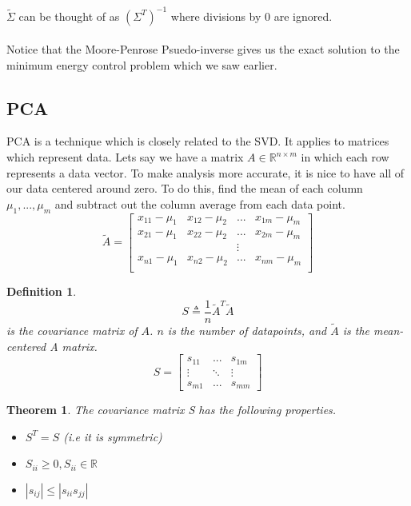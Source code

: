 \documentclass{article}
\newtheorem{theorem}{Theorem}
\newtheorem{definition}{Definition}
\begin{document}
$\tilde{\Sigma}$ can be thought of as $(\Sigma^T)^{-1}$ where divisions by 0 are ignored.
\\\\Notice that the Moore-Penrose Psuedo-inverse gives us the exact solution to the minimum energy control problem which we saw earlier.
\subsection{PCA}
PCA is a technique which is closely related to the SVD. It applies to matrices which represent data.
Lets say we have a matrix $A \in \mathbb{R}^{n \times m}$ in which each row represents a data vector.
To make analysis more accurate, it is nice to have all of our data centered around zero.
To do this, find the mean of each column $\mu_1, ..., \mu_m$ and subtract out the column average from each data point.
\[
    \tilde{A} = \left[
        \begin{array}{cccc}
            x_{11} - \mu_1 & x_{12} - \mu_2 & ... &x_{1m} - \mu_m\\
            x_{21} - \mu_1 & x_{22} - \mu_2 & ... &x_{2m} - \mu_m\\
             & & \vdots & \\
             x_{n1} - \mu_1 & x_{n2} - \mu_2 & ... &x_{nm} - \mu_m\\
        \end{array}
    \right]
\]
\begin{definition}
    $$ S \triangleq \frac{1}{n}\tilde{A}^T\tilde{A}$$
    is the covariance matrix of $A$. $n$ is the number of datapoints,
    and $\tilde{A}$ is the mean-centered A matrix.
    \[
        S = \left[
            \begin{array}{ccc}
                s_{11} & ... & s_{1m}\\
                \vdots & \ddots & \vdots\\
                s_{m1} & ... & s_{mm}
            \end{array}
        \right]
    \]
\end{definition}
\begin{theorem}
    The covariance matrix S has the following properties.
    \begin{itemize}
        \item $S^T = S$ (i.e it is symmetric)
        \item $S_{ii} \ge 0, S_{ii} \in \mathbb{R}$
        \item $|s_{ij}| \le |s_{ii}s_{jj}|$
    \end{itemize}
\end{theorem}
\end{document}
